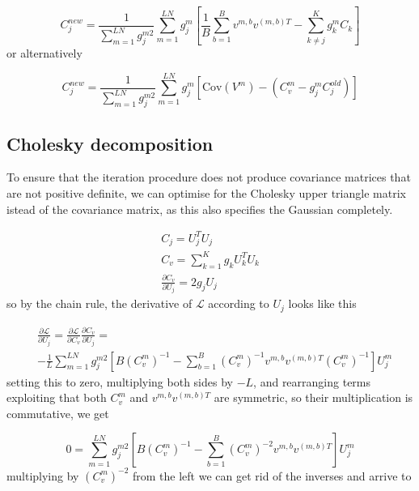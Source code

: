 \documentclass{paper}
\begin{document}
\begin{equation}
C_j^{new} = \frac{1}{\sum_{m=1}^{LN} g_j^{m2}} \sum_{m=1}^{LN} g_j^m \left[ \frac{1}{B} \sum_{b=1}^B v^{m,b} v^{(m,b)T} - \sum_{k \neq j}^K g_k^m C_k \right]
\end{equation}
%
or alternatively

\begin{equation}
C_j^{new} = \frac{1}{\sum_{m=1}^{LN} g_j^{m2}} \sum_{m=1}^{LN} g_j^m \left[ \textrm{Cov} (V^{m}) - (C_v^m - g_j^m C_j^{old}) \right]
\end{equation}

\subsection{Cholesky decomposition}

To ensure that the iteration procedure does not produce covariance matrices that are not positive definite, we can optimise for the Cholesky upper triangle matrix istead of the covariance matrix, as this also specifies the Gaussian completely.

\begin{eqnarray}
C_j = U_j^T U_j \\
C_v = \sum_{k=1}^K g_k U_k^T U_k \\
\frac{\partial C_v}{\partial U_j} = 2 g_j U_j
\end{eqnarray}
%
so by the chain rule, the derivative of $\mathcal{L}$ according to $U_j$ looks like this

\begin{equation}
\begin{split}
&\frac{\partial \mathcal{L}}{\partial U_j} = \frac{\partial \mathcal{L}}{\partial C_v} \frac{\partial C_v}{\partial U_j} = \\
& -\frac{1}{L} \sum_{m=1}^{LN} g_j^{m2} \left[ B \left( C_v^m \right)^{-1} - \sum_{b=1}^B \left( C_v^m \right)^{-1} v^{m,b} v^{(m,b)T} \left( C_v^m \right)^{-1} \right] U_j^m
\end{split}
\end{equation}
%
setting this to zero, multiplying both sides by $-L$, and rearranging terms exploiting that both $C_v^m$ and $v^{m,b} v^{(m,b)T}$ are symmetric, so their multiplication is commutative, we get

\begin{equation}
0 = \sum_{m=1}^{LN} g_j^{m2} \left[ B \left( C_v^m \right)^{-1} - \sum_{b=1}^B \left( C_v^m \right)^{-2} v^{m,b} v^{(m,b)T} \right] U_j^m
\end{equation}
%
multiplying by $\left( C_v^m \right)^{-2}$ from the left we can get rid of the inverses and arrive to

\end{document}
